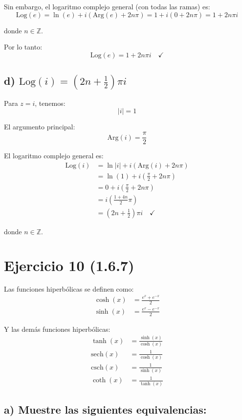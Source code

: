 \documentclass{article}
\begin{document}
Sin embargo, el logaritmo complejo general (con todas las ramas) es:
$$\text{Log}(e) = \ln(e) + i(\text{Arg}(e) + 2n\pi) = 1 + i(0 + 2n\pi) = 1 + 2n\pi i$$

donde $n \in \mathbb{Z}$.

Por lo tanto:
$$\text{Log}(e) = 1 + 2n\pi i \quad \checkmark$$

\subsection*{d) $\text{Log}(i) = \left(2n + \frac{1}{2}\right)\pi i$}

Para $z = i$, tenemos:
$$|i| = 1$$

El argumento principal:
$$\text{Arg}(i) = \frac{\pi}{2}$$

El logaritmo complejo general es:
\begin{align*}
\text{Log}(i) &= \ln|i| + i(\text{Arg}(i) + 2n\pi) \\
             &= \ln(1) + i\left(\frac{\pi}{2} + 2n\pi\right) \\
             &= 0 + i\left(\frac{\pi}{2} + 2n\pi\right) \\
             &= i\left(\frac{1 + 4n}{2}\pi\right) \\
             &= \left(2n + \frac{1}{2}\right)\pi i \quad \checkmark
\end{align*}

donde $n \in \mathbb{Z}$.

\newpage
\section*{Ejercicio 10 (1.6.7)}

Las funciones hiperbólicas se definen como:
\begin{align*}
\cosh(x) &= \frac{e^x + e^{-x}}{2} \\
\sinh(x) &= \frac{e^x - e^{-x}}{2}
\end{align*}

Y las demás funciones hiperbólicas:
\begin{align*}
\tanh(x) &= \frac{\sinh(x)}{\cosh(x)} \\
\text{sech}(x) &= \frac{1}{\cosh(x)} \\
\text{csch}(x) &= \frac{1}{\sinh(x)} \\
\coth(x) &= \frac{1}{\tanh(x)}
\end{align*}

\subsection*{a) Muestre las siguientes equivalencias:}
\end{document}
